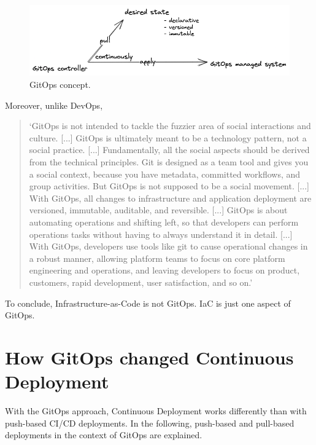 \begin{figure}[h]
	\centering
	\includegraphics[width=1.00\linewidth]{assets/gitops-concept.png}
	\caption{GitOps concept.
	}
	\label{fig:gitOpsConcept}	
\end{figure}

Moreover, unlike DevOps,
\begin{quotation}
\noindent
\enquote*{GitOps is not intended to tackle the fuzzier area of social interactions and culture. [...] GitOps is ultimately meant to be a technology pattern, not a social practice. [...] Fundamentally, all the social aspects should be derived from the technical principles. Git is designed as a team tool and gives you a social context, because you have metadata, committed workflows, and group activities. But GitOps is not supposed to be a social movement. [...] With GitOps, all changes to infrastructure and application deployment are versioned, immutable, auditable, and reversible. [...] GitOps is about automating operations and shifting left, so that developers can perform operations tasks without having to always understand it in detail. [...] With GitOps, developers use tools like git to cause operational changes in a robust manner, allowing platform teams to focus on core platform engineering and operations, and leaving developers to focus on product, customers, rapid development, user satisfaction, and so on.}
\autocite{definingGitOpsGithubReadmeFeatured}
\end{quotation}

To conclude, Infrastructure-as-Code is not GitOps. IaC is just one aspect of GitOps.








\section{How GitOps changed Continuous Deployment}
\label{theoretical-background:gitops-cd}

With the GitOps approach,
Continuous Deployment works differently than with push-based CI/CD deployments.
In the following,
push-based and pull-based deployments in the context of GitOps are explained.


